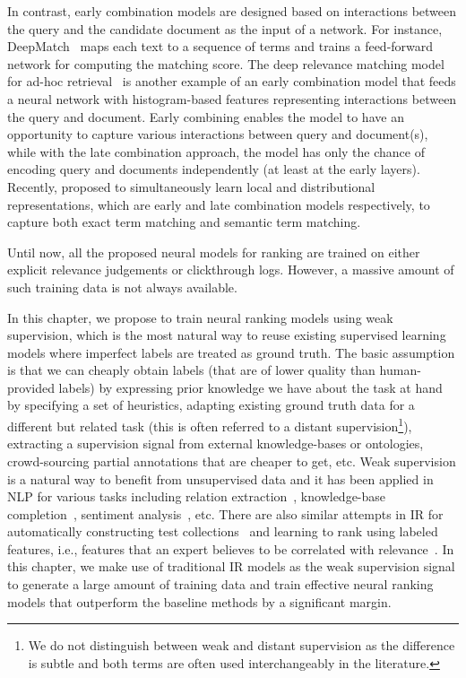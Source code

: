 In contrast, early combination models are designed based on interactions between the query and the candidate document as the input of a network. 
For instance, DeepMatch~\citep{Lu:2013} maps each text to a sequence of terms and trains a feed-forward network for computing the matching score. 
The deep relevance matching model for ad-hoc retrieval~\citep{Guo:2016} is another example of an early combination model that feeds a neural network with histogram-based features representing interactions between the query and document. 
Early combining enables the model to have an opportunity to capture various interactions between query and document(s), while with the late combination approach, the model has only the chance of encoding query and documents independently (at least at the early layers). Recently, \citet{Mitra:2016} proposed to simultaneously learn local and distributional representations, which are early and late combination models respectively,  to capture both exact term matching and semantic term matching.

Until now, all the proposed neural models for ranking are trained on either explicit relevance judgements or clickthrough logs. However, a massive amount of such training data is not always available. 

In this chapter, we propose to train neural ranking models using weak supervision, which is the most natural way to reuse existing supervised learning models where imperfect labels are treated as ground truth.
The basic assumption is that we can cheaply obtain labels (that are of lower quality than human-provided labels) by expressing prior knowledge we have about the task at hand by specifying a set of heuristics, adapting existing ground truth data for a different but related task (this is often referred to a distant supervision\footnote{We do not distinguish between weak and distant supervision as the difference is subtle and both terms are often used interchangeably in the literature.}), extracting a supervision signal from external knowledge-bases or ontologies, crowd-sourcing partial annotations that are cheaper to get, etc.
%
Weak supervision is a natural way to benefit from unsupervised data and it has been applied in NLP for various tasks including relation extraction~\citep{Bing:2015,Han:2016}, knowledge-base completion~\citep{Hoffmann:2011}, sentiment analysis~\citep{Severyn:2015:SemEval}, etc.  
There are also similar attempts in IR for automatically constructing test collections~\citep{Asadi:2011} and learning to rank using labeled features, i.e., features that an expert believes to be correlated with relevance~\citep{Diaz:2016:ictir}.
In this chapter, we make use of traditional IR models as the weak supervision signal to generate a large amount of training data and train effective neural ranking models that outperform the baseline methods by a significant margin.


